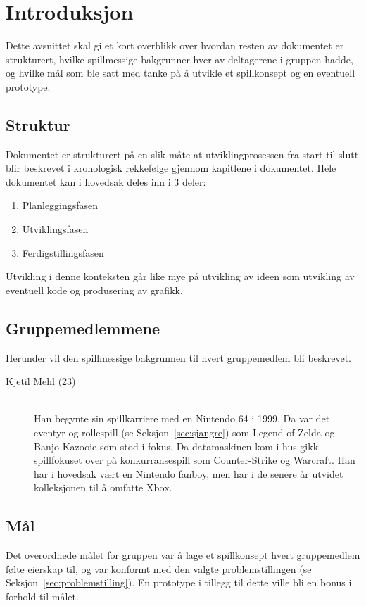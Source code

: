 \section{Introduksjon}
Dette avsnittet skal gi et kort overblikk over hvordan resten av
dokumentet er strukturert, hvilke spillmessige bakgrunner hver av
deltagerene i gruppen hadde, og hvilke mål som ble satt med tanke på å
utvikle et spillkonsept og en eventuell prototype.
\subsection{Struktur}
Dokumentet er strukturert på en slik måte at utviklingprosessen fra
start til slutt blir beskrevet i kronologisk rekkefølge gjennom
kapitlene i dokumentet. Hele dokumentet kan i hovedsak deles inn i 3
deler:
\begin{enumerate}
	\item Planleggingsfasen
	\item Utviklingsfasen
	\item Ferdigstillingsfasen
\end{enumerate}
Utvikling i denne konteksten går like mye på utvikling av ideen som
utvikling av eventuell kode og produsering av grafikk.
\subsection{Gruppemedlemmene}
Herunder vil den spillmessige bakgrunnen til hvert gruppemedlem bli
beskrevet.
\begin{description}
\item[Kjetil Mehl (23)] \hfill \\
Han begynte sin spillkarriere med en Nintendo 64\cite{n64} i 1999. Da
var det eventyr og rollespill (se Seksjon~\ref{sec:sjangre}) som Legend
of Zelda\cite{legendofzelda} og Banjo Kazooie\cite{banjokazooie} som
stod i fokus. Da datamaskinen kom i hus gikk spillfokuset  over på
konkurransespill som Counter-Strike og Warcraft. Han har i hovedsak vært
en Nintendo fanboy\cite{fanboy}, men har i de senere år utvidet
kolleksjonen til å omfatte Xbox.
\end{description}
\subsection{Mål}
Det overordnede målet for gruppen var å lage et spillkonsept hvert
gruppemedlem følte eierskap til, og var konformt med den valgte
problemstillingen (se Seksjon~\ref{sec:problemstilling}). En prototype i
tillegg til dette ville bli en bonus i forhold til målet.
